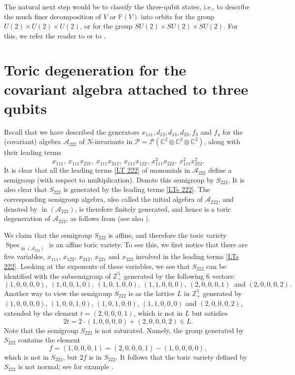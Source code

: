 \documentclass[reqno,11pt]{amsart}
\theoremstyle{remark}
\theoremstyle{definition}
\numberwithin{equation}{section}
\newcommand\ot{\otimes}
\newcommand\ini{\operatorname{in}}
\newcommand\Spec{\operatorname{Spec}}
\newcommand{\eq}{\begin{equation}}
\newcommand{\eeq}{\end{equation}}
\newcommand{\bbC}{\mathbb{C}}
\newcommand{\bbZ}{\mathbb{Z}}
\newcommand{\Pol}{\mathcal{P}}
\newcommand{\cA}{\mathcal{A}}
\newcommand{\bbP}{\mathbb{P}}
\begin{document}
The natural next step would be to classify the three-qubit states, i.e., to describe the much finer decomposition of $V$ or $\bbP(V)$ into orbits for the group $U(2)\times U(2)\times U(2)$, or for the group $SU(2)\times SU(2)\times SU(2)$. For this, we refer the reader to \cite[Proposition 1.8]{B} or to \cite{MW1}.


\section{Toric degeneration for the covariant algebra attached to three qubits}

Recall that we have described the generators $x_{111},d_{12},d_{13},d_{23},f_3$ and $f_4$ for the (covariant) algebra $\cA_{222}$ of $N$-invariants in $\Pol=\Pol(\bbC^2\ot\bbC^2\ot\bbC^2)$, along with their leading terms
\eq\label{LTs 222}
x_{111},\ x_{111}x_{221},\ x_{111}x_{212},\ x_{111}x_{122},\ x_{111}^2x_{222},\ x_{111}^2x_{222}^2.
\eeq
It is clear that all the leading terms \eqref{LT 222} of monomials in $\cA_{222}$ define a semigroup (with respect to multiplication). Denote this semigroup by $S_{222}$. It is also clear that $S_{222}$ is generated by the leading terms \eqref{LTs 222}. The corresponding semigroup algebra, also called the initial algebra of $\cA_{222}$, and denoted by $\ini(\cA_{222})$, is therefore finitely generated, and hence is a toric degeneration of $\cA_{222}$, as follows from \cite{CHV} (see also \cite[Proposition 2.5.2]{HJLTW}). 


We claim that the semigroup $S_{222}$ is affine, and therefore the toric variety $\Spec_{\ini(\cA_{222})}$ is an affine toric variety. To see this, we first notice that there are five variables, 
$x_{111}$, $x_{122}$, $x_{212}$, $x_{221}$ and $x_{222}$ 
involved in the leading terms \eqref{LTs 222}. Looking at the exponents of these variables, we see that $S_{222}$ can be identified with the subsemigroup of $\bbZ_+^5$ generated by the following 6 vectors:
\[
(1,0,0,0,0),\ (1,0,0,1,0),\ (1,0,1,0,0),\ (1,1,0,0,0),\ (2,0,0,0,1)\ \text{ and } (2,0,0,0,2).
\]
Another way to view the semigroup $S_{222}$ is as the lattice $L$ in $\bbZ_+^5$
generated by $(1,0,0,0,0)$, $(1,0,0,1,0)$, 
$(1,0,1,0,0)$, $(1,1,0,0,0)$  and $ (2,0,0,0,2)$, extended by the element $t=(2,0,0,0,1)$, which is not in $L$ but satisfies
\[
2t=2\cdot (1,0,0,0,0) + (2,0,0,0,2) \in L.
\] 
Note that the semigroup $S_{222}$ is not saturated. Namely,  the group generated by $S_{222}$ contains the element
\[
f=(1,0,0,0,1)=(2,0,0,0,1)-(1,0,0,0,0),
\] 
which is not in $S_{222}$, but $2f$ is in $S_{222}$. It follows that the toric variety defined by $S_{222}$ is not normal; see for example \cite[Theorem 1.3.5]{C}.
\end{document}
